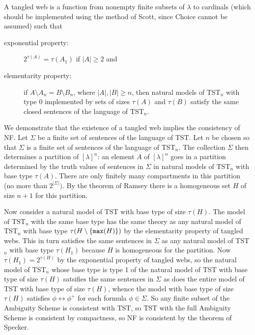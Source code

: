 \documentclass[12pt]{article}
\begin{document}
A tangled web is a function from nonempty finite subsets of $\lambda$ to cardinals (which should be implemented using the method of Scott, since Choice cannot be assumed) such that 

\begin{description}

\item[exponential property:]  $2^{\tau(A)} = \tau(A_1)$ if $|A| \geq 2$ and \item[elementarity property:]   if $A \setminus A_n = B \setminus B_n$, where $|A|, |B| \geq n$, then natural models of TST$_n$ with type 0 implemented by
sets of sizes $\tau(A)$ and $\tau(B)$ satisfy the same closed sentences of the language of TST$_n$.

\end{description}

We demonstrate that the existence of a tangled web implies the consistency of NF.  Let $\Sigma$ be a finite set of sentences of the language of TST.  Let $n$ be chosen so that
$\Sigma$ is a finite set of sentences of the language of TST$_n$.  The collection $\Sigma$ then determines a partition of $[\lambda]^n$:  an element $A$ of $[\lambda]^n$ goes in a partition determined by the truth values of sentences in $\Sigma$ in natural models of TST$_n$ with base type $\tau(A)$.  There are only finitely many compartments in this partition
(no more than $2^{|\Sigma|})$.  By the theorem of Ramsey there is a homogeneous set $H$ of size $n+1$ for this partition.

Now consider a natural model of TST with base type of size $\tau(H)$.  The model of TST$_n$ with the same base type has the same theory as any natural model of TST$_n$ with
base type $\tau(H \setminus \{{\tt max}(H)\})$ by the elementarity property of tangled webs.  This in turn satisfies the same sentences in $\Sigma$ as any natural model of TST$_n$ with base type $\tau(H_1)$ because $H$ is homogeneous for the partition.  Now $\tau(H_1) = 2^{\tau(H)}$ by the exponential property of tangled webs, so the natural model of TST$_n$ whose base type is type 1 of the natural model of TST with base type of size $\tau(H)$ satsifies the same sentences in $\Sigma$ as does the entire model of TST with base type
of size $\tau(H)$, whence the model with base type of size $\tau(H)$ satisfies $\phi \leftrightarrow \phi^+$ for each formula $\phi \in \Sigma$.  So any finite subset of the Ambiguity Scheme is consistent with TST, so TST with the full Ambiguity Scheme is consistent by compactness, so NF is consistent by the theorem of Specker.
\end{document}
